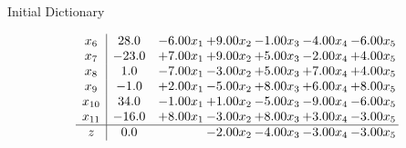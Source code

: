 \documentclass[8pt]{article}
\begin{document}
Initial Dictionary 

\[\begin{array}{c| c c@{\hskip 2pt} c@{\hskip 2pt} c@{\hskip 2pt} c@{\hskip 2pt} c@{\hskip 2pt} }
 x_{6}   &  28.0 & -6.00 x_{1} & +  9.00 x_{2} & -1.00 x_{3} & -4.00 x_{4} & -6.00 x_{5}\\
 x_{7}   &  -23.0 & +  7.00 x_{1} & +  9.00 x_{2} & +  5.00 x_{3} & -2.00 x_{4} & +  4.00 x_{5}\\
 x_{8}   &  1.0 & -7.00 x_{1} & -3.00 x_{2} & +  5.00 x_{3} & +  7.00 x_{4} & +  4.00 x_{5}\\
 x_{9}   &  -1.0 & +  2.00 x_{1} & -5.00 x_{2} & +  8.00 x_{3} & +  6.00 x_{4} & +  8.00 x_{5}\\
 x_{10}   &  34.0 & -1.00 x_{1} & +  1.00 x_{2} & -5.00 x_{3} & -9.00 x_{4} & -6.00 x_{5}\\
 x_{11}   &  -16.0 & +  8.00 x_{1} & -3.00 x_{2} & +  8.00 x_{3} & +  3.00 x_{4} & -3.00 x_{5}\\
\hline
z    &  0.0  &   & -2.00 x_{2} & -4.00 x_{3} & -3.00 x_{4} & -3.00 x_{5}\\
\end{array}\]
\end{document}
